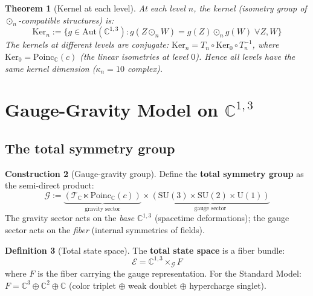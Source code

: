 \documentclass[12pt]{article}
\theoremstyle{plain}
\newtheorem{theorem}{Theorem}[section]
\theoremstyle{definition}
\newtheorem{definition}[theorem]{Definition}
\newtheorem{construction}[theorem]{Construction}
\theoremstyle{remark}
\newcommand{\Aut}{\mathrm{Aut}}
\newcommand{\Ker}{\mathrm{Ker}}
\newcommand{\Poinc}{\mathrm{Poinc}}
\newcommand{\SU}{\mathrm{SU}}
\newcommand{\UU}{\mathrm{U}}
\newcommand{\CC}{\mathbb{C}}
\begin{document}
\begin{theorem}[Kernel at each level]\label{thm:kernel-level}
At each level $n$, the kernel (isometry group of $\odot_n$-compatible structures) is:
\begin{equation}
\Ker_n := \{g \in \Aut(\CC^{1,3}) : g(Z \odot_n W) = g(Z) \odot_n g(W)\;\forall Z, W\}
\end{equation}
The kernels at different levels are conjugate: $\Ker_n = T_n \circ \Ker_0 \circ T_n^{-1}$, where $\Ker_0 = \Poinc_\CC(c)$ (the linear isometries at level $0$). Hence all levels have the same kernel dimension ($\kappa_n = 10$ complex).
\end{theorem}


\section{Gauge-Gravity Model on $\CC^{1,3}$}
\label{sec:gauge-gravity}

\subsection{The total symmetry group}

\begin{construction}[Gauge-gravity group]\label{constr:gauge-gravity}
Define the \textbf{total symmetry group} as the semi-direct product:
\begin{equation}\label{eq:total-group}
\boxed{\mathcal{G} := \underbrace{(\mathcal{T}_\CC \ltimes \Poinc_\CC(c))}_{\text{gravity sector}} \times \underbrace{(\SU(3) \times \SU(2) \times \UU(1))}_{\text{gauge sector}}}
\end{equation}
The gravity sector acts on the \emph{base} $\CC^{1,3}$ (spacetime deformations); the gauge sector acts on the \emph{fiber} (internal symmetries of fields).
\end{construction}

\begin{definition}[Total state space]\label{def:total-state}
The \textbf{total state space} is a fiber bundle:
\begin{equation}
\mathcal{E} = \CC^{1,3} \times_\mathcal{G} F
\end{equation}
where $F$ is the fiber carrying the gauge representation. For the Standard Model: $F = \CC^3 \oplus \CC^2 \oplus \CC$ (color triplet $\oplus$ weak doublet $\oplus$ hypercharge singlet).
\end{definition}
\end{document}
